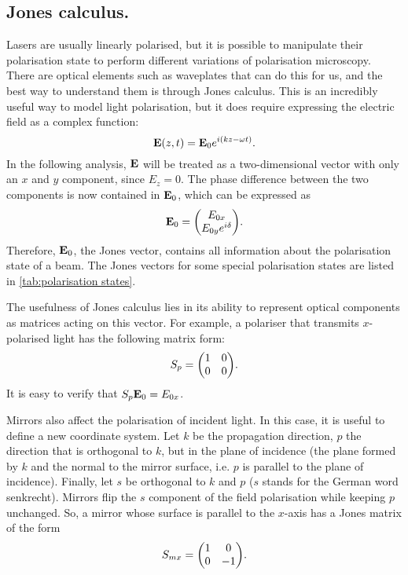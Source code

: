 \subsection{Jones calculus.} Lasers are usually linearly polarised, but it is possible to manipulate their polarisation state to perform different variations of polarisation microscopy. There are optical elements such as waveplates that can do this for us, and the best way to understand them is through Jones calculus. This is an incredibly useful way to model light polarisation, but it does require expressing the electric field as a complex function:
\begin{equation}
	\vb{E}(z, t) = \vb{E}_0 e^{i(kz-\omega t)}.
	\label{eq:propagator}
\end{equation}
In the following analysis, $ \vb{E} $ will be treated as a two-dimensional vector with only an $ x $ and $ y $ component, since $ E_z = 0 $. %
The phase difference between the two components is now contained in $ \vb{E}_0 $, which can be expressed as
\begin{equation}
	\vb{E}_0 = \mqty(\Eox \\ \Eoy e^{i\delta} ).
\end{equation}
Therefore, $ \vb{E}_0 $, the Jones vector, contains all information about the polarisation state of a beam. The Jones vectors for some special polarisation states are listed in \autoref{tab:polarisation states}.

The usefulness of Jones calculus lies in its ability to represent optical components as matrices acting on this vector. For example, a polariser that transmits $ x $-polarised light has the following matrix form:
\begin{equation}
	S_p = \mqty(1 & 0 \\ 0 & 0).
\end{equation}
It is easy to verify that $ S_p \vb{E}_0 = E_{0x} $. 

Mirrors also affect the polarisation of incident light. In this case, it is useful to define a new coordinate system. Let $ k $ be the propagation direction, $ p $ the direction that is orthogonal to $ k $, but in the plane of incidence (the plane formed by $ k $ and the normal to the mirror surface, i.e. $ p $ is parallel to the plane of incidence). Finally, let $ s $ be orthogonal to $ k $ and $ p $ ($ s $ stands for the German word senkrecht). Mirrors flip the $ s $ component of the field polarisation while keeping $ p $ unchanged. So, a mirror whose surface is parallel to the $ x $-axis has a Jones matrix of the form
\begin{equation}
	S_{mx} = \mqty(1 & 0 \\ 0 & -1).
\end{equation}


